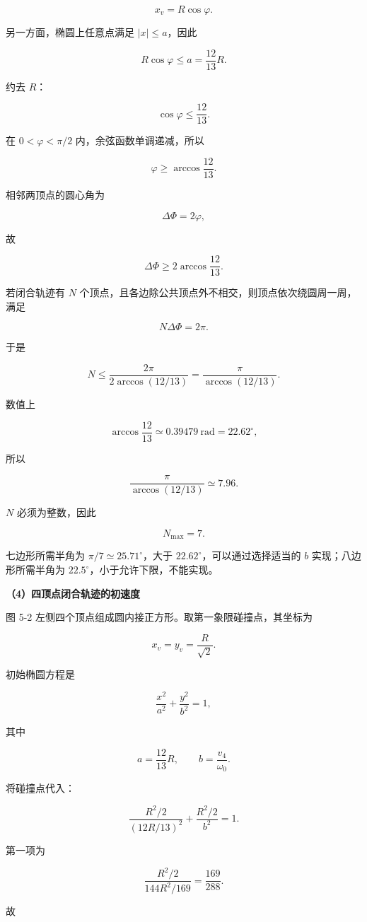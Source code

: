 \documentclass[12pt,a4paper,UTF8]{ctexart}
\begin{document}
\[x_v=R\cos\varphi.\]

另一方面，椭圆上任意点满足 \(|x|\le a\)，因此

\[
R\cos\varphi\le a=\frac{12}{13}R.
\]

约去 \(R\)：

\[
\cos\varphi\le\frac{12}{13}.
\]

在 \(0<\varphi<\pi/2\) 内，余弦函数单调递减，所以

\[
\boxed{\varphi\ge\arccos\frac{12}{13}}.
\]

相邻两顶点的圆心角为

\[
\Delta\Phi=2\varphi,
\]

故

\[
\boxed{\Delta\Phi\ge2\arccos\frac{12}{13}}.
\]

若闭合轨迹有 \(N\)
个顶点，且各边除公共顶点外不相交，则顶点依次绕圆周一周，满足

\[N\Delta\Phi=2\pi.\]

于是

\[
N\le\frac{2\pi}{2\arccos(12/13)}
=\frac{\pi}{\arccos(12/13)}.
\]

数值上

\[
\arccos\frac{12}{13}\simeq0.39479\ \mathrm{rad}
=22.62^\circ,
\]

所以

\[
\frac{\pi}{\arccos(12/13)}\simeq7.96.
\]

\(N\) 必须为整数，因此

\[
\boxed{N_{\max}=7}.
\]

七边形所需半角为 \(\pi/7\simeq25.71^\circ\)，大于
\(22.62^\circ\)，可以通过选择适当的 \(b\) 实现；八边形所需半角为
\(22.5^\circ\)，小于允许下限，不能实现。

\textbf{（4）四顶点闭合轨迹的初速度}

图 5-2 左侧四个顶点组成圆内接正方形。取第一象限碰撞点，其坐标为

\[
x_v=y_v=\frac{R}{\sqrt2}.
\]

初始椭圆方程是

\[
\frac{x^2}{a^2}+\frac{y^2}{b^2}=1,
\]

其中

\[a=\frac{12}{13}R,\qquad b=\frac{v_4}{\omega_0}.\]

将碰撞点代入：

\[
\frac{R^2/2}{(12R/13)^2}
+\frac{R^2/2}{b^2}=1.
\]

第一项为

\[
\frac{R^2/2}{144R^2/169}=\frac{169}{288}.
\]

故
\end{document}
